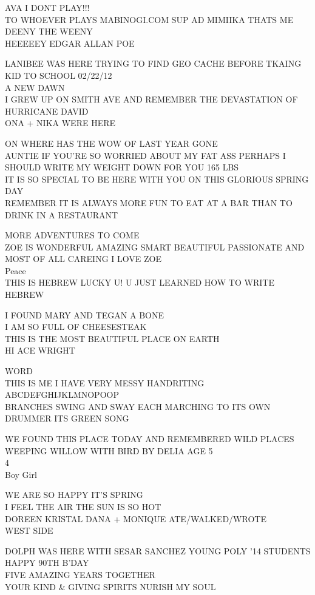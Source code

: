 \documentclass[10pt,letterpaper]{article}
\begin{document}
AVA I DONT PLAY!!!\\
TO WHOEVER PLAYS MABINOGI.COM SUP AD MIMIIKA THATS ME\\
DEENY THE WEENY\\
HEEEEEY EDGAR ALLAN POE

LANIBEE WAS HERE TRYING TO FIND GEO CACHE BEFORE TKAING KID TO SCHOOL 02/22/12\\
A NEW DAWN\\
I GREW UP ON SMITH AVE AND REMEMBER THE DEVASTATION OF HURRICANE DAVID\\
ONA + NIKA WERE HERE

ON WHERE HAS THE WOW OF LAST YEAR GONE\\
AUNTIE IF YOU'RE SO WORRIED ABOUT MY FAT ASS PERHAPS I SHOULD WRITE MY WEIGHT DOWN  FOR YOU 165 LBS\\
IT IS SO SPECIAL TO BE HERE WITH YOU ON THIS GLORIOUS SPRING DAY\\
REMEMBER IT IS ALWAYS MORE FUN TO EAT AT A BAR THAN TO DRINK IN A RESTAURANT

MORE ADVENTURES TO COME\\
ZOE IS WONDERFUL AMAZING SMART BEAUTIFUL PASSIONATE AND MOST OF ALL CAREING I LOVE ZOE\\
Peace\\
THIS IS HEBREW LUCKY U! U JUST LEARNED HOW TO WRITE HEBREW

I FOUND MARY AND TEGAN A BONE\\
I AM SO FULL OF CHEESESTEAK\\
THIS IS THE MOST BEAUTIFUL PLACE ON EARTH\\
HI ACE WRIGHT

WORD\\
THIS IS ME I HAVE VERY MESSY HANDRITING\\
ABCDEFGHIJKLMNOPOOP\\
BRANCHES SWING AND SWAY EACH MARCHING TO ITS OWN DRUMMER ITS GREEN SONG

WE FOUND THIS PLACE TODAY AND REMEMBERED WILD PLACES\\
WEEPING WILLOW WITH BIRD BY DELIA AGE 5\\
4\\
Boy Girl

WE ARE SO HAPPY IT'S SPRING\\
I FEEL THE AIR THE SUN IS SO HOT\\
DOREEN KRISTAL DANA + MONIQUE ATE/WALKED/WROTE\\
WEST SIDE

DOLPH WAS HERE WITH SESAR SANCHEZ YOUNG POLY '14 STUDENTS\\
HAPPY 90TH B'DAY\\
FIVE AMAZING YEARS TOGETHER\\
YOUR KIND \& GIVING SPIRITS NURISH MY SOUL
\end{document}
